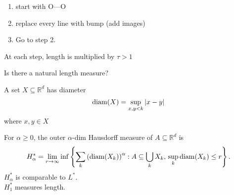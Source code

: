 \begin{example}
	\begin{enumerate}
		\item start with O---O
		\item replace every line with bump (add images)
		\item Go to step 2.
	\end{enumerate}
	At each step, length is multiplied by $\tau > 1$
\end{example}
Is there a natural length measure?

\begin{definition}[Diameter]
	A set $X \subseteq \mathbb{R}^d$ has diameter 
	\[
		\operatorname*{diam}(X) = \sup_{x, y < k} |x - y|
	\]
	where $x, y \in X$
\end{definition}

\begin{definition}
	For $\alpha \geq 0$, the outer $\alpha$-dim Hausdorff measure of $A \subseteq \mathbb{R}^d$ is
	\[
		H_{\alpha}^* = \lim_{r \to \infty} \inf\left\{ \sum_{k} \left(\operatorname*{diam}(X_{k}) \right)^{\alpha} : A \subseteq \bigcup_{k} X_k, \,
		\sup_{k} \operatorname*{diam}(X_k) \leq r \right\}.
	\]
	$H_{\alpha}^*$ is comparable to $L^*$. \\
	$H_{1}^*$ measures length.
\end{definition}

